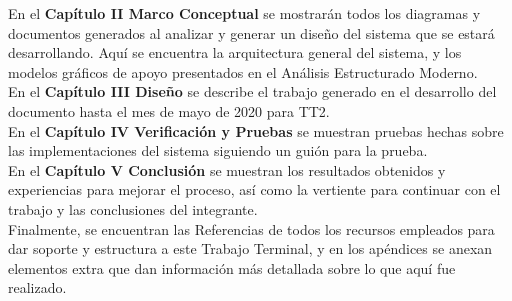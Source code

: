En el \textbf{Capítulo II Marco Conceptual} se mostrarán todos los diagramas y documentos generados al analizar y generar un diseño del sistema que se estará desarrollando. Aquí se encuentra la arquitectura general del sistema, y los modelos gráficos de apoyo presentados en el Análisis Estructurado Moderno.\\

En el \textbf{Capítulo III Diseño} se describe el trabajo generado en el desarrollo del documento hasta el mes de mayo de 2020 para TT2.\\

En el \textbf{Capítulo IV Verificación y Pruebas} se muestran pruebas hechas sobre las implementaciones del sistema siguiendo un guión para la prueba.\\
 
En el \textbf{Capítulo V Conclusión} se muestran los resultados obtenidos y experiencias para mejorar el proceso, así como la vertiente para continuar con el trabajo y las conclusiones del integrante.\\

Finalmente, se encuentran las Referencias de todos los recursos empleados para dar soporte y estructura a este Trabajo Terminal, y en los apéndices se anexan elementos extra que dan información más detallada sobre lo que aquí fue realizado.\\
